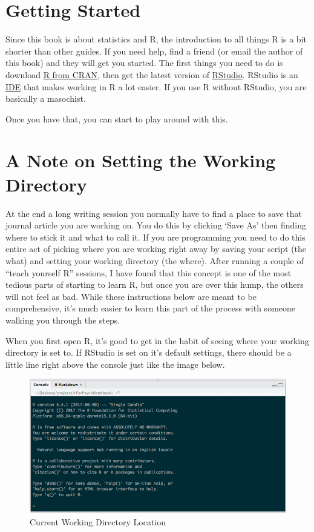 \documentclass[]{book}
\theoremstyle{definition}
\theoremstyle{definition}
\theoremstyle{definition}
\theoremstyle{remark}
\begin{document}
\section{Getting Started}\label{getting-started}

Since this book is about statistics and R, the introduction to all
things R is a bit shorter than other guides. If you need help, find a
friend (or email the author of this book) and they will get you started.
The first things you need to do is download
\href{https://cran.r-project.org/}{R from CRAN}, then get the latest
version of \href{https://www.rstudio.com/}{RStudio}. RStudio is an
\href{https://en.wikipedia.org/wiki/Integrated_development_environment}{IDE}
that makes working in R a lot easier. If you use R without RStudio, you
are basically a masochist.

Once you have that, you can start to play around with this.

\section{A Note on Setting the Working
Directory}\label{a-note-on-setting-the-working-directory}

At the end a long writing session you normally have to find a place to
save that journal article you are working on. You do this by clicking
`Save As' then finding where to stick it and what to call it. If you are
programming you need to do this entire act of picking where you are
working right away by saving your script (the what) and setting your
working directory (the where). After running a couple of ``teach
yourself R'' sessions, I have found that this concept is one of the most
tedious parts of starting to learn R, but once you are over this hump,
the others will not feel as bad. While these instructions below are
meant to be comprehensive, it's much easier to learn this part of the
process with someone walking you through the steps.

When you first open R, it's good to get in the habit of seeing where
your working directory is set to. If RStudio is set on it's default
settings, there should be a little line right above the console just
like the image below.

\begin{figure}
\centering
\includegraphics{img/setwdinr.png}
\caption{Current Working Directory Location}
\end{figure}
\end{document}
